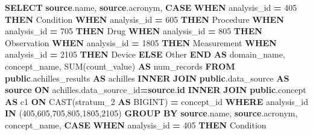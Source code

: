 \documentclass[
]{book}
\newenvironment{Shaded}{\begin{snugshade}}{\end{snugshade}}
\newcommand{\ControlFlowTok}[1]{\textcolor[rgb]{0.13,0.29,0.53}{\textbf{#1}}}
\newcommand{\DecValTok}[1]{\textcolor[rgb]{0.00,0.00,0.81}{#1}}
\newcommand{\FunctionTok}[1]{\textcolor[rgb]{0.00,0.00,0.00}{#1}}
\newcommand{\KeywordTok}[1]{\textcolor[rgb]{0.13,0.29,0.53}{\textbf{#1}}}
\newcommand{\NormalTok}[1]{#1}
\newcommand{\OperatorTok}[1]{\textcolor[rgb]{0.81,0.36,0.00}{\textbf{#1}}}
\newcommand{\StringTok}[1]{\textcolor[rgb]{0.31,0.60,0.02}{#1}}
\begin{document}
\begin{Shaded}
\begin{Highlighting}[]
\KeywordTok{SELECT} \KeywordTok{source}\NormalTok{.name,}
    \KeywordTok{source}\NormalTok{.acronym,}
    \ControlFlowTok{CASE} \ControlFlowTok{WHEN}\NormalTok{ analysis\_id }\OperatorTok{=} \DecValTok{405} \ControlFlowTok{THEN} \StringTok{\textquotesingle{}Condition\textquotesingle{}}
    \ControlFlowTok{WHEN}\NormalTok{ analysis\_id }\OperatorTok{=} \DecValTok{605} \ControlFlowTok{THEN} \StringTok{\textquotesingle{}Procedure\textquotesingle{}}
    \ControlFlowTok{WHEN}\NormalTok{ analysis\_id }\OperatorTok{=} \DecValTok{705} \ControlFlowTok{THEN} \StringTok{\textquotesingle{}Drug\textquotesingle{}}
    \ControlFlowTok{WHEN}\NormalTok{ analysis\_id }\OperatorTok{=} \DecValTok{805} \ControlFlowTok{THEN} \StringTok{\textquotesingle{}Observation\textquotesingle{}}
    \ControlFlowTok{WHEN}\NormalTok{ analysis\_id }\OperatorTok{=} \DecValTok{1805} \ControlFlowTok{THEN} \StringTok{\textquotesingle{}Measurement\textquotesingle{}}
    \ControlFlowTok{WHEN}\NormalTok{ analysis\_id }\OperatorTok{=} \DecValTok{2105} \ControlFlowTok{THEN} \StringTok{\textquotesingle{}Device\textquotesingle{}}
    \ControlFlowTok{ELSE} \StringTok{\textquotesingle{}Other\textquotesingle{}} \ControlFlowTok{END} \KeywordTok{AS}\NormalTok{ domain\_name,}
\NormalTok{    concept\_name,}
    \FunctionTok{SUM}\NormalTok{(count\_value) }\KeywordTok{AS}\NormalTok{ num\_records}
\KeywordTok{FROM} \KeywordTok{public}\NormalTok{.achilles\_results }\KeywordTok{AS}\NormalTok{ achilles}
\KeywordTok{INNER} \KeywordTok{JOIN} \KeywordTok{public}\NormalTok{.data\_source }\KeywordTok{AS} \KeywordTok{source} \KeywordTok{ON}\NormalTok{ achilles.data\_source\_id}\OperatorTok{=}\KeywordTok{source}\NormalTok{.}\KeywordTok{id}
\KeywordTok{INNER} \KeywordTok{JOIN} \KeywordTok{public}\NormalTok{.concept }\KeywordTok{AS}\NormalTok{ c1 }\KeywordTok{ON} \FunctionTok{CAST}\NormalTok{(stratum\_2 }\KeywordTok{AS}\NormalTok{ BIGINT) }\OperatorTok{=}\NormalTok{ concept\_id}
\KeywordTok{WHERE}\NormalTok{ analysis\_id }\KeywordTok{IN}\NormalTok{ (}\DecValTok{405}\NormalTok{,}\DecValTok{605}\NormalTok{,}\DecValTok{705}\NormalTok{,}\DecValTok{805}\NormalTok{,}\DecValTok{1805}\NormalTok{,}\DecValTok{2105}\NormalTok{)}
\KeywordTok{GROUP} \KeywordTok{BY} \KeywordTok{source}\NormalTok{.name, }\KeywordTok{source}\NormalTok{.acronym, concept\_name, }
    \ControlFlowTok{CASE} \ControlFlowTok{WHEN}\NormalTok{ analysis\_id }\OperatorTok{=} \DecValTok{405} \ControlFlowTok{THEN} \StringTok{\textquotesingle{}Condition\textquotesingle{}}

\end{Highlighting}
\end{Shaded}
\end{document}

